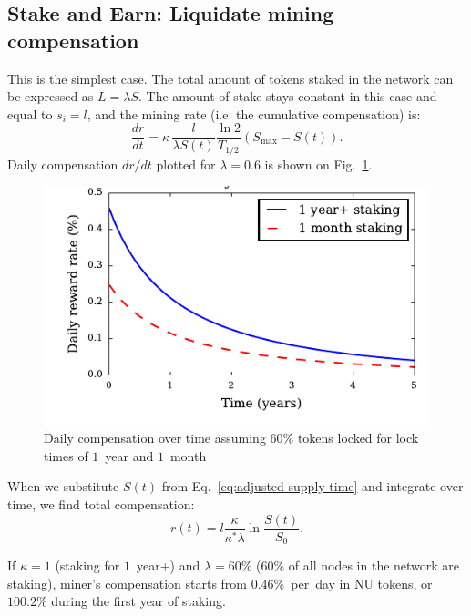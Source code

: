 \documentclass[longbibliography,nofootinbib,twocolumn]{revtex4-1}
\newcommand{\figref}[1]{Fig.~\ref{#1}}
\begin{document}
\subsection{Stake and Earn: Liquidate mining compensation}

This is the simplest case.
The total amount of tokens staked in the network can be expressed as $L=\lambda S$.
The amount of stake stays constant in this case and equal to $s_i = l$, and the mining rate (i.e. the cumulative compensation) is:
\begin{equation}
    \frac{dr}{dt} =  \kappa\, \frac{l}{\lambda S(t)} \frac{\ln{2}}{T_{1/2}} \left( S_{\max} - S(t)\right).
\end{equation}
Daily compensation $dr/dt$ plotted for $\lambda=0.6$ is shown on \figref{fig:daily-compensation}.

\begin{figure}
    \includegraphics[width=\columnwidth]{pdf/daily-compensation.pdf}
    \caption{Daily compensation over time assuming $60\%$ tokens locked for lock times of $1$~year and $1$~month}
    \label{fig:daily-compensation}
\end{figure}

When we substitute $S(t)$ from Eq.~\ref{eq:adjusted-supply-time} and integrate over time, we find total compensation:
\begin{equation}
    r(t) = l \frac{\kappa}{\kappa^* \lambda} \ln\frac{S(t)}{S_0}.
\end{equation}

If $\kappa=1$ (staking for $1$~year+) and $\lambda=60\%$ ($60\%$ of all nodes in the network are staking),
miner's compensation starts from $0.46\%$~per~day in NU tokens,
or $100.2\%$ during the first year of staking.
\end{document}
